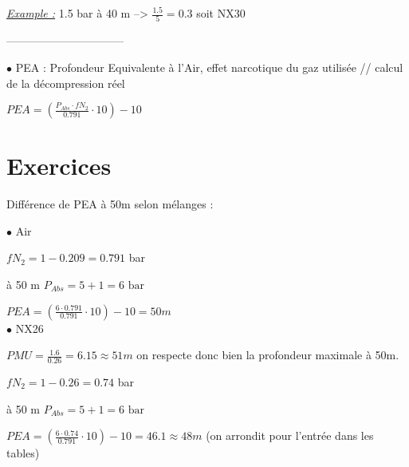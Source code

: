 \documentclass[12pt,a4paper,notitlepage,colorinlistoftodos]{article}
\begin{document}
\underline{\textit{Example :}} 1.5 bar à 40 m --> $\frac{1.5}{5} = 0.3$ soit NX30

--------------------------------

$\bullet$ PEA : Profondeur Equivalente à l'Air, effet narcotique du gaz utilisée // calcul de la décompression réel

$PEA = \left(\frac{P_{Abs} \cdot fN_2}{0.791} \cdot 10\right) -10 $

\section{Exercices}

Différence de PEA à 50m selon mélanges :

$\bullet$ Air

$fN_2 = 1 - 0.209 = 0.791$ bar

à 50 m  $P_{Abs} = 5 + 1 = 6 \text{ bar}$

$PEA = \left(\frac{6 \cdot 0.791}{0.791} \cdot 10\right) -10 = 50m$
\\

$\bullet$ NX26

$PMU = \frac{1.6}{0.26} = 6.15 \approx 51m$ on respecte donc bien la profondeur maximale à 50m.

$fN_2 = 1 - 0.26 = 0.74$ bar

à 50 m  $P_{Abs} = 5 + 1 = 6 \text{ bar}$

$PEA = \left(\frac{6 \cdot 0.74}{0.791} \cdot 10\right) -10 = 46.1 \approx 48 m$
 (on arrondit pour l'entrée dans les tables)

\cite{}


\end{document}
